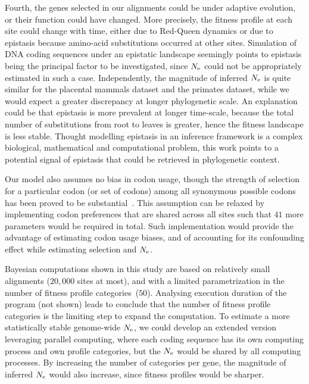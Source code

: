 Fourth, the genes selected in our alignments could be under adaptive evolution, or their function could have changed.
More precisely, the fitness profile at each site could change with time, either due to Red-Queen dynamics or due to epistasis because amino-acid substitutions occurred at other sites.
Simulation of \acrshort{DNA} coding sequences under an epistatic landscape seemingly points to epistasis being the principal factor to be investigated, since $N_{\mathrm{e}}$ could not be appropriately estimated in such a case.
Independently, the magnitude of inferred $N_{\mathrm{e}}$ is quite similar for the placental mammals dataset and the primates dataset, while we would expect a greater discrepancy at longer phylogenetic scale.
An explanation could be that epistasis is more prevalent at longer time-scale, because the total number of substitutions from root to leaves is greater, hence the fitness landscape is less stable.
Thought modelling epistasis in an inference framework is a complex biological, mathematical and computational problem, this work points to a potential signal of epistasis that could be retrieved in phylogenetic context.

Our model also assumes no bias in codon usage, though the strength of selection for a particular codon (or set of codons) among all synonymous possible codons has been proved to be substantial~\citep{Yang2008,Plotkin2011}.
This assumption can be relaxed by implementing codon preferences that are shared across all sites such that $41$ more parameters would be required in total.
Such implementation would provide the advantage of estimating codon usage biases, and of accounting for its confounding effect while estimating selection and $N_{\mathrm{e}}$.

Bayesian computations shown in this study are based on relatively small alignments ($20,000$ sites at most), and with a limited parametrization in the number of fitness profile categories~($50$).
Analysing execution duration of the program (not shown) leads to conclude that the number of fitness profile categories is the limiting step to expand the computation.
To estimate a more statistically stable genome-wide $N_{\mathrm{e}}$, we could develop an extended version leveraging parallel computing, where each coding sequence has its own computing process and own profile categories, but the $N_{\mathrm{e}}$ would be shared by all computing processes.
By increasing the number of categories per gene, the magnitude of inferred $N_{\mathrm{e}}$ would also increase, since fitness profiles would be sharper.

